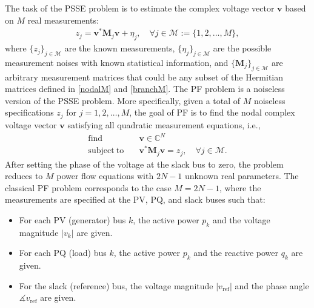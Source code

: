 \documentclass[journal,twoside]{IEEEtran}
\newcommand{\st}{\mathrm{subject~to}}
\newcommand{\bv}{\mathbf{v}}
\newcommand{\bM}{\mathbf{M}}
\newcommand{\cM}{{\mathcal M}}
\begin{document}
The task of the PSSE problem is to estimate the complex voltage vector $\bv$ based on $M$ real measurements:
\begin{align}
z_j = \bv^{*}\bM_j\bv + \eta_j, \quad \forall j \in \cM:=\{1,2,\ldots,M\},
\end{align}
where $\{z_j\}_{j \in \cM}$ are the known measurements, $\{\eta_j\}_{j \in \cM}$ are the possible measurement noises with  known statistical information, and $\{\bM_j\}_{j \in \cM}$ are
 arbitrary measurement matrices that could be  any subset of the Hermitian matrices defined in \eqref{nodalM} and \eqref{branchM}.
The  PF problem is a noiseless version of the PSSE problem.
More specifically, given a total of $M$ noiseless specifications $z_j$ for $j=1,2,\ldots,M$, the goal of PF
is to find the nodal complex voltage vector $\bv$ satisfying all quadratic measurement equations, i.e., 
\begin{subequations}\label{pfp}
\begin{align}
\mathrm{find}\quad &\bv \in \mathbb{C}^N \\
\st\quad  &\bv^{*}\bM_j\bv = z_j,\quad\forall j\in \cM.
\end{align}
\end{subequations}
After setting the phase of the voltage at the slack bus to zero, the problem reduces to $M$ power flow  equations with $2N-1$ unknown real parameters. The classical PF problem corresponds to the case $M=2N-1$, where the measurements are specified at the PV, PQ, and slack buses such that: 
\begin{itemize}
\item 
For each PV  (generator) bus $k$, the active power $p_k$ and the voltage magnitude $|v_k|$ are given.
\item 
For each PQ  (load) bus $k$, the active power $p_k$ and the reactive power $q_k$ are given.
\item For the slack  (reference) bus, the voltage magnitude $|v_{\mathrm{ref}}|$ and the phase angle $\measuredangle v_{\mathrm{ref}}$ are given.
\end{itemize}
\end{document}
